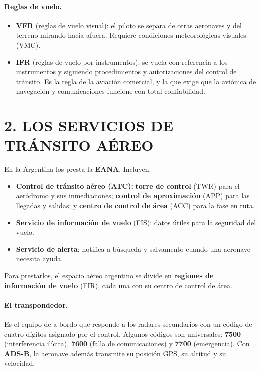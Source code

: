 \paragraph*{Reglas de vuelo.}
\begin{itemize}
  \item \textbf{VFR} (reglas de vuelo visual): el piloto se separa de otras aeronaves y del
        terreno mirando hacia afuera. Requiere condiciones meteorológicas visuales (VMC).
  \item \textbf{IFR} (reglas de vuelo por instrumentos): se vuela con referencia a los
        instrumentos y siguiendo procedimientos y autorizaciones del control de tránsito. Es la
        regla de la aviación comercial, y la que exige que la aviónica de navegación y
        comunicaciones funcione con total confiabilidad.
\end{itemize}

\section*{2. LOS SERVICIOS DE TRÁNSITO AÉREO}

En la Argentina los presta la \textbf{EANA}. Incluyen:
\begin{itemize}
  \item \textbf{Control de tránsito aéreo (ATC):} \textbf{torre de control} (TWR) para el aeródromo
        y sus inmediaciones; \textbf{control de aproximación} (APP) para las llegadas y salidas; y
        \textbf{centro de control de área} (ACC) para la fase en ruta.
  \item \textbf{Servicio de información de vuelo} (FIS): datos útiles para la seguridad del vuelo.
  \item \textbf{Servicio de alerta}: notifica a búsqueda y salvamento cuando una aeronave necesita
        ayuda.
\end{itemize}
Para prestarlos, el espacio aéreo argentino se divide en \textbf{regiones de información de vuelo}
(FIR), cada una con su centro de control de área.

\paragraph*{El transpondedor.} Es el equipo de a bordo que responde a los radares secundarios
con un código de cuatro dígitos asignado por el control. Algunos códigos son universales:
\textbf{7500} (interferencia ilícita), \textbf{7600} (falla de comunicaciones) y \textbf{7700}
(emergencia). Con \textbf{ADS-B}, la aeronave además transmite su posición GPS, su altitud y su
velocidad.

